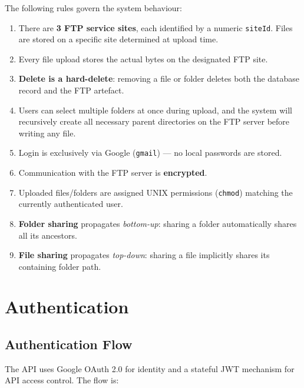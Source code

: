 \documentclass[12pt,a4paper]{article}
\begin{document}
The following rules govern the system behaviour:

\begin{enumerate}[label=\arabic*.]
  \item There are \textbf{3 FTP service sites}, each identified by a numeric \texttt{siteId}. Files are stored on a specific site determined at upload time.
  \item Every file upload stores the actual bytes on the designated FTP site.
  \item \textbf{Delete is a hard-delete}: removing a file or folder deletes both the database record and the FTP artefact.
  \item Users can select multiple folders at once during upload, and the system will recursively create all necessary parent directories on the FTP server before writing any file.
  \item Login is exclusively via Google (\texttt{gmail}) — no local passwords are stored.
  \item Communication with the FTP server is \textbf{encrypted}.
  \item Uploaded files/folders are assigned UNIX permissions (\texttt{chmod}) matching the currently authenticated user.
  \item \textbf{Folder sharing} propagates \emph{bottom-up}: sharing a folder automatically shares all its ancestors.
  \item \textbf{File sharing} propagates \emph{top-down}: sharing a file implicitly shares its containing folder path.
\end{enumerate}

\newpage

\section{Authentication}

\subsection{Authentication Flow}

The API uses Google OAuth 2.0 for identity and a stateful JWT mechanism for API access control. The flow is:
\end{document}
